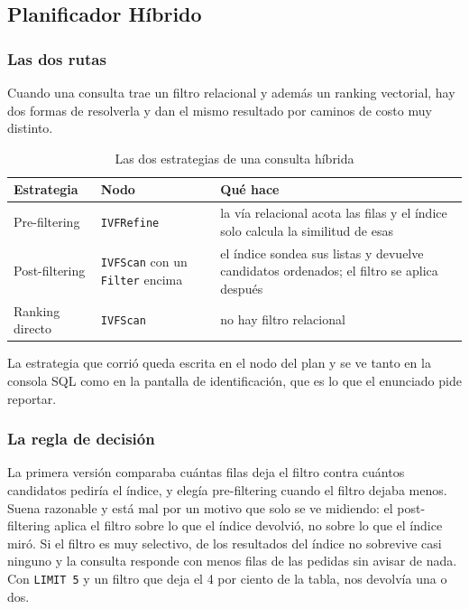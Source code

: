 \documentclass[a4paper,12pt]{article}
\begin{document}
\subsection{Planificador Híbrido}

\subsubsection{Las dos rutas}

Cuando una consulta trae un filtro relacional y además un ranking vectorial, hay
dos formas de resolverla y dan el mismo resultado por caminos de costo muy
distinto.

\begin{table}[H]
\centering
\caption{Las dos estrategias de una consulta híbrida}
\begin{tabularx}{\textwidth}{@{}llX@{}}
\toprule
\textbf{Estrategia} & \textbf{Nodo} & \textbf{Qué hace} \\
\midrule
Pre-filtering & \texttt{IVFRefine} & la vía relacional acota las filas y el índice
solo calcula la similitud de esas \\
Post-filtering & \texttt{IVFScan} con un \texttt{Filter} encima & el índice sondea
sus listas y devuelve candidatos ordenados; el filtro se aplica después \\
Ranking directo & \texttt{IVFScan} & no hay filtro relacional \\
\bottomrule
\end{tabularx}
\end{table}

La estrategia que corrió queda escrita en el nodo del plan y se ve tanto en la
consola SQL como en la pantalla de identificación, que es lo que el enunciado
pide reportar.

\subsubsection{La regla de decisión}

La primera versión comparaba cuántas filas deja el filtro contra cuántos
candidatos pediría el índice, y elegía pre-filtering cuando el filtro dejaba
menos. Suena razonable y está mal por un motivo que solo se ve midiendo: el
post-filtering aplica el filtro sobre lo que el índice devolvió, no sobre lo que
el índice miró. Si el filtro es muy selectivo, de los resultados del índice no
sobrevive casi ninguno y la consulta responde con menos filas de las pedidas sin
avisar de nada. Con \texttt{LIMIT 5} y un filtro que deja el 4 por ciento de la
tabla, nos devolvía una o dos.
\end{document}
